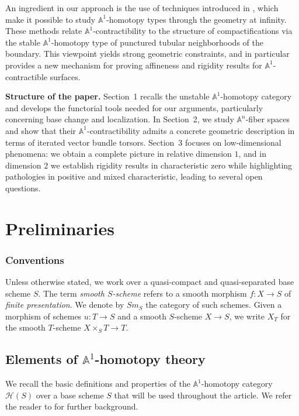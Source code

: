 \documentclass[10pt]{amsart}
\renewcommand{\AA}{\mathbb{A}}
\numberwithin{equation}{section} %
\theoremstyle{plain}
\theoremstyle{definition}
\theoremstyle{remark}
\begin{document}
An ingredient in our approach is the use of techniques introduced in \cite{DDO}, which make it possible to study $\AA^1$-homotopy types through the geometry at infinity. These methods relate $\AA^1$-contractibility to the structure of compactifications via the stable $\AA^1$-homotopy type of punctured tubular neighborhoods of the boundary. This viewpoint yields strong geometric constraints, and in particular provides a new mechanism for proving affineness and rigidity results for $\AA^1$-contractible surfaces.

\medskip
\noindent
\textbf{Structure of the paper.}
Section~1 recalls the unstable $\AA^1$-homotopy category and develops the functorial tools needed for our arguments, particularly concerning base change and localization. In Section~2, we study $\AA^n$-fiber spaces and show that their $\AA^1$-contractibility admits a concrete geometric description in terms of iterated vector bundle torsors. Section~3 focuses on low-dimensional phenomena: we obtain a complete picture in relative dimension $1$, and in dimension $2$ we establish rigidity results in characteristic zero while highlighting pathologies in positive and mixed characteristic, leading to several open questions.







\section{Preliminaries}

\subsubsection{Conventions}
Unless otherwise stated, we work over a quasi-compact and quasi-separated base scheme $S$. The term \emph{smooth $S$-scheme} refers to a smooth morphism $f \colon X \to S$ of \emph{finite presentation}. We denote by $Sm_S$ the category of such schemes. Given a morphism of schemes $u \colon T \to S$ and a smooth $S$-scheme $X \to S$, 
we write $X_T$ for the smooth $T$-scheme $X \times_S T \to T$.

\subsection{Elements of \texorpdfstring{$\AA^1$}{A1}-homotopy theory}\label{A1-homotopy theory}
We recall the basic definitions and properties of the $\mathbb{A}^1$-homotopy category $\mathcal{H}(S)$ over a base scheme $S$ that will be used throughout the article. We refer the reader to \cite{MV99, blander2001local, zbMATH02028920, zbMATH05116082, antieau2017primer, wickelgren2020unstable} for further background. 
\medskip
\end{document}
